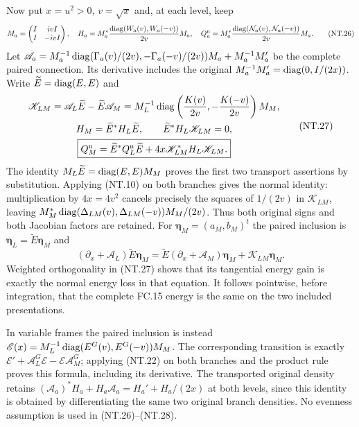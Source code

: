 Now put $x=u^2>0$, $v=\sqrt x$ and, at each level, keep
\[
 M_a=\begin{pmatrix}I&ivI\\ I&-ivI\end{pmatrix},\quad
 H_a=M_a^*\frac{\operatorname{diag}(W_a(v),W_a(-v))}{2v}M_a,\quad
 Q_a^{\rm n}=M_a^*\frac{\operatorname{diag}(\mathcal N_a(v),\mathcal N_a(-v))}{2v}M_a.
 \tag{NT.26}
\]
Let $\mathscr A_a=M_a^{-1}
\operatorname{diag}(\Gamma_a(v)/(2v),-\Gamma_a(-v)/(2v))M_a+M_a^{-1}M_a'$
be the complete paired connection. Its derivative includes the
original $M_a^{-1}M_a'=\operatorname{diag}(0,I/(2x))$.
Write $\widetilde E=\operatorname{diag}(E,E)$ and
\[
 \begin{gathered}
 \mathscr K_{LM}=\mathscr A_L\widetilde E
                       -\widetilde E\mathscr A_M
   =M_L^{-1}\operatorname{diag}\left(\frac{K(v)}{2v},
                            -\frac{K(-v)}{2v}\right)M_M,\\
 H_M=\widetilde E^*H_L\widetilde E,\qquad
 \widetilde E^*H_L\mathscr K_{LM}=0,\\
 \boxed{Q_M^{\rm n}=\widetilde E^*Q_L^{\rm n}\widetilde E
                   +4x\mathscr K_{LM}^*H_L\mathscr K_{LM}.}
 \end{gathered}
 \tag{NT.27}
\]
The identity $M_L\widetilde E=\operatorname{diag}(E,E)M_M$ proves the
first two transport assertions by substitution. Applying (NT.10)
on both branches gives the normal identity: multiplication by
$4x=4v^2$ cancels precisely the squares of $1/(2v)$ in
$\mathscr K_{LM}$, leaving
$M_M^*\operatorname{diag}(\Delta_{LM}(v),\Delta_{LM}(-v))M_M/(2v)$.
Thus both original signs and both Jacobian factors are retained.
For $\boldsymbol\eta_M=(a_M,b_M)^t$ the paired inclusion is
$\boldsymbol\eta_L=\widetilde E\boldsymbol\eta_M$ and
\[
 (\partial_x+\mathscr A_L)\widetilde E\boldsymbol\eta_M
   =\widetilde E(\partial_x+\mathscr A_M)\boldsymbol\eta_M
                               +\mathscr K_{LM}\boldsymbol\eta_M.
 \tag{NT.28}
\]
Weighted orthogonality in (NT.27) shows that its tangential energy
gain is exactly the normal energy loss in that equation. It follows
pointwise, before integration, that the complete FC.15 energy is
the same on the two included presentations.

In variable frames the paired inclusion is instead
$\mathscr E(x)=M_L^{-1}\operatorname{diag}(E^G(v),E^G(-v))M_M$.
The corresponding transition is exactly
$\mathscr E'+\mathscr A_L^G\mathscr E-
\mathscr E\mathscr A_M^G$; applying (NT.22) on both branches
and the product rule proves this formula, including its derivative.
The transported original density retains
$(\mathscr A_a)^*H_a+H_a\mathscr A_a=H_a'+H_a/(2x)$
at both levels, since this identity is obtained by differentiating
the same two original branch densities. No evenness assumption
is used in (NT.26)--(NT.28).

